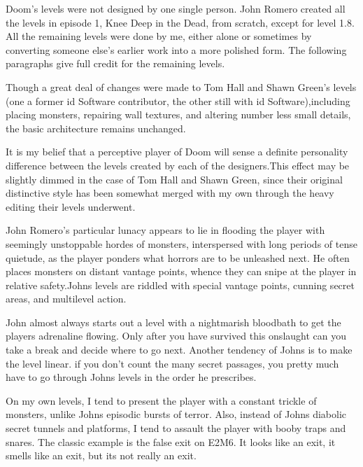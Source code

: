 Doom's levels were not designed by one single person. John Romero created all the levels in episode 1, Knee Deep in the Dead, from scratch, except for level 1.8. All the remaining levels were done by me, either alone or sometimes by converting someone else's earlier work into a more polished form. The following paragraphs give full credit for the remaining levels.\\
\par
 Though a great deal of changes were made to Tom Hall and Shawn Green's levels (one a former id Software contributor, the other still with id Software),including placing monsters, repairing wall textures, and altering number less small details, the basic architecture remains unchanged.\\
\par
It is my belief that a perceptive player of Doom will sense a definite personality difference between the levels created by each of the designers.This effect may be slightly dimmed in the case of Tom Hall and Shawn Green, since their original distinctive style has been somewhat merged with my own through the heavy editing their levels underwent.\\
\par
 John Romero's particular lunacy appears to lie in flooding the player with seemingly unstoppable hordes of monsters, interspersed with long periods of tense quietude, as the player ponders what horrors are to be unleashed next. He often places monsters on distant vantage points, whence they can snipe at the player in relative safety.Johns levels are riddled with special vantage points, cunning secret areas, and multilevel action.\\
 \par
  John almost always starts out a level with a nightmarish bloodbath to get the players adrenaline flowing. Only after you have survived this onslaught can you take a break and decide where to go next. Another tendency of Johns is to make the level linear. if you don't count the many secret passages, you pretty much have to go through Johns levels in the order he prescribes.\\
  \par
   On my own levels, I tend to present the player with a constant trickle of monsters, unlike Johns episodic bursts of terror. Also, instead of Johns diabolic secret tunnels and platforms, I tend to assault the player with booby traps and snares. The classic example is the false exit on E2M6. It looks like an exit, it smells like an exit, but its not really an exit.\\
